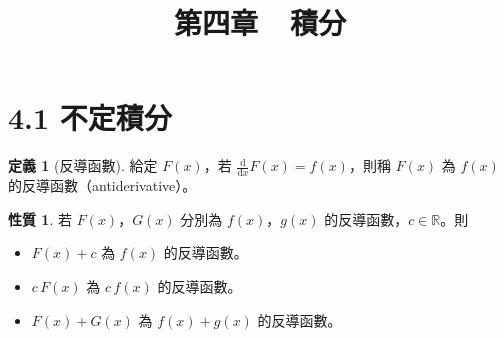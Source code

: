 \documentclass[12pt]{extarticle}
\newcommand{\ds}{\displaystyle}
\theoremstyle{definition}
\newtheorem*{dfn}{定義}
\newtheorem*{prp}{性質}
\begin{document}
\title{\texorpdfstring{\vspace{-16mm} 第四章\ \ 積分}{第四章\ \ 積分}} 
\author{\vspace{-5em}}
\date{\vspace{-5em}}
\maketitle
\thispagestyle{firststyle}

\section*{4.1 不定積分}

\begin{dfn}[反導函數]
  給定 $\ds F(x)$，若 $\ds\frac{\text{d}}{\text{d}x} F(x) = f(x)$，則稱 $F(x)$ 為 $f(x)$ 的反導函數（antiderivative）。 
\end{dfn}

\begin{prp}若 $\ds F(x)$，$\ds G(x)$ 分別為 $f(x)$，$g(x)$ 的反導函數，$c\in\mathbb{R}$。則
  \begin{itemize}\setlength{\itemsep}{0pt}
    \item $\ds F(x) + c$ 為 $f(x)$ 的反導函數。
    \item $\ds c\,F(x)$ 為 $c\,f(x)$ 的反導函數。
    \item $\ds F(x) + G(x)$ 為 $f(x) + g(x)$ 的反導函數。
  \end{itemize}
\end{prp}
\end{document}
